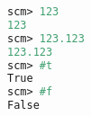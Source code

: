 \begin{lstlisting}[language=Scheme]
scm> 123
123
scm> 123.123
123.123
scm> #t
True
scm> #f
False
\end{lstlisting}
